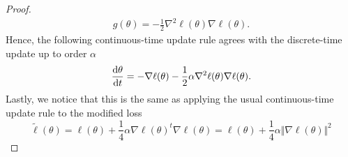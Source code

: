 \documentclass[reqno]{amsart}
\begin{document}
\begin{proposition}
\begin{proof}
\begin{align*}
    g(\theta) = -\frac{1}{2}\nabla^2\ell(\theta) \nabla\ell(\theta).
\end{align*}
Hence, the following continuous-time update rule agrees with the discrete-time update up to order $\alpha$
\begin{equation}
    \frac{\mathop{}\!\mathrm{d} \theta}{\mathop{}\!\mathrm{d} t} = -\nabla\ell(\theta) - \frac{1}{2}\alpha\nabla^2\ell(\theta)\nabla\ell(\theta).
\end{equation}
Lastly, we notice that this is the same as applying the usual continuous-time update rule to the modified loss
\begin{equation}
\tilde\ell(\theta) = \ell(\theta) + \frac{1}{4}\alpha\nabla\ell{(\theta)}^t \nabla\ell(\theta) = \ell(\theta) + \frac{1}{4}\alpha\big\Vert\nabla\ell(\theta) \big\Vert^2
\end{equation}
\end{proof}
\end{proposition}
\end{document}
